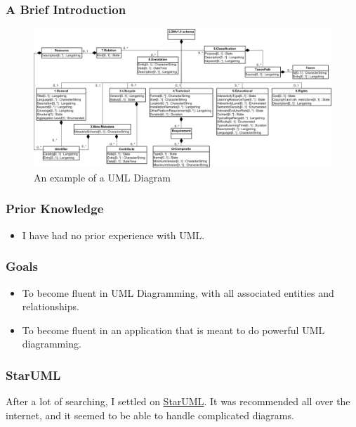 \documentclass[xclolor=dvipsnames]{beamer}            %
\begin{document}
\begin{darkframes}
    \begin{frame}[fragile]
        \frametitle{A Brief Introduction}
        \begin{figure}[H]
            \centering
            \includegraphics[width=\linewidth]{assets/uml.png}
            \caption{An example of a UML Diagram}
            \label{fig:sample-uml}
        \end{figure}
    \end{frame}


    \begin{frame}
        \frametitle{Prior Knowledge}

        \begin{itemize}
            \item I have had no prior experience with UML.
        \end{itemize}
    \end{frame}

    \begin{frame}
        \frametitle{Goals}

        \begin{itemize}
            \item To become fluent in UML Diagramming, with all associated entities and relationships.
            \item To become fluent in an application that is meant to do powerful UML diagramming.
        \end{itemize}
    \end{frame}

    \begin{frame}[fragile]
        \frametitle{StarUML}

        After a lot of searching, I settled on \href{http://staruml.io}{StarUML}. It was recommended all over the internet, and it seemed to be able to handle complicated diagrams.
    \end{frame}



\end{darkframes}
\end{document}
